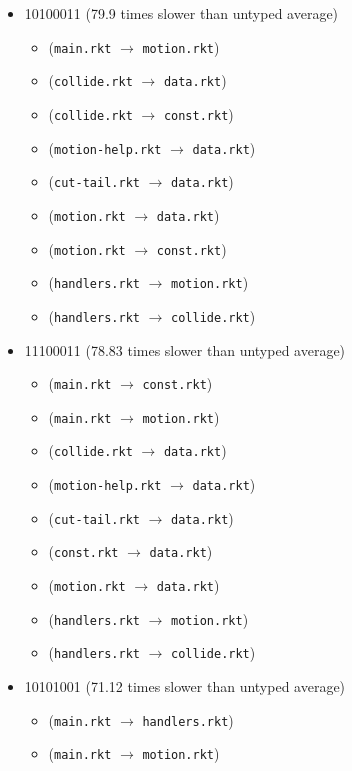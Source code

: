 \documentclass{article}
\newcommand{\mono}[1]{\texttt{#1}}
\begin{document}
\begin{itemize}
\begin{itemize}
  \end{itemize}
\item 10100011 (79.9 times slower than untyped average)
  \begin{itemize}
  \item (\mono{main.rkt} $\rightarrow$ \mono{motion.rkt})
  \item (\mono{collide.rkt} $\rightarrow$ \mono{data.rkt})
  \item (\mono{collide.rkt} $\rightarrow$ \mono{const.rkt})
  \item (\mono{motion-help.rkt} $\rightarrow$ \mono{data.rkt})
  \item (\mono{cut-tail.rkt} $\rightarrow$ \mono{data.rkt})
  \item (\mono{motion.rkt} $\rightarrow$ \mono{data.rkt})
  \item (\mono{motion.rkt} $\rightarrow$ \mono{const.rkt})
  \item (\mono{handlers.rkt} $\rightarrow$ \mono{motion.rkt})
  \item (\mono{handlers.rkt} $\rightarrow$ \mono{collide.rkt})
  \end{itemize}
\item 11100011 (78.83 times slower than untyped average)
  \begin{itemize}
  \item (\mono{main.rkt} $\rightarrow$ \mono{const.rkt})
  \item (\mono{main.rkt} $\rightarrow$ \mono{motion.rkt})
  \item (\mono{collide.rkt} $\rightarrow$ \mono{data.rkt})
  \item (\mono{motion-help.rkt} $\rightarrow$ \mono{data.rkt})
  \item (\mono{cut-tail.rkt} $\rightarrow$ \mono{data.rkt})
  \item (\mono{const.rkt} $\rightarrow$ \mono{data.rkt})
  \item (\mono{motion.rkt} $\rightarrow$ \mono{data.rkt})
  \item (\mono{handlers.rkt} $\rightarrow$ \mono{motion.rkt})
  \item (\mono{handlers.rkt} $\rightarrow$ \mono{collide.rkt})
  \end{itemize}
\item 10101001 (71.12 times slower than untyped average)
  \begin{itemize}
  \item (\mono{main.rkt} $\rightarrow$ \mono{handlers.rkt})
  \item (\mono{main.rkt} $\rightarrow$ \mono{motion.rkt})

\end{itemize}
\end{itemize}
\end{document}
